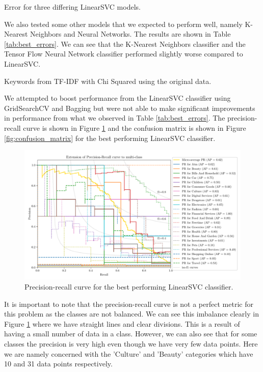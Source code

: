 \begin{table}[!ht]
\centering
\caption{Error for three differing LinearSVC models.}

\label{tab:lsvc_errors}
\end{table}

We also tested some other models that we expected to perform well, namely K-Nearest Neighbors and Neural Networks. The results are shown in Table \ref{tab:best_errors}. We can see that the K-Nearest Neighbors classifier and the Tensor Flow Neural Network classifier performed slightly worse compared to LinearSVC.

\begin{table}[!ht]
\centering
\caption{Keywords from TF-IDF with Chi Squared using the original data.}

\label{tab:best_errors}
\end{table}

We attempted to boost performance from the LinearSVC classifier using GridSearchCV and Bagging but were not able to make significant improvements in performance from what we observed in Table \ref{tab:best_errors}. The precision-recall curve is shown in Figure \ref{fig:pr_curve} and the confusion matrix is shown in Figure \ref{fig:confusion_matrix} for the best performing LinearSVC classifier.

\begin{figure}[ht]
  \centering
  \includegraphics[width=\textwidth]{../img/plot_pr_curve.pdf}
  \caption{Precision-recall curve for the best performing LinearSVC classifier.}
  \label{fig:pr_curve}
\end{figure}

It is important to note that the precision-recall curve is not a perfect metric for this problem as the classes are not balanced. We can see this imbalance clearly in Figure \ref{fig:pr_curve} where we have straight lines and clear divisions. This is a result of having a small number of data in a class. However, we can also see that for some classes the precision is very high even though we have very few data points. Here we are namely concerned with the 'Culture' and 'Beauty' categories which have 10 and 31 data points respectively.

